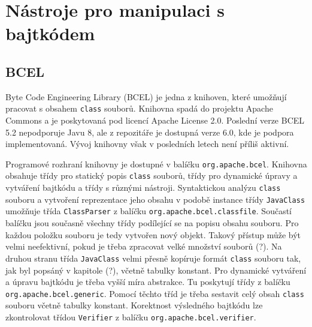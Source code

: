 \chapter{Nástroje pro manipulaci s bajtkódem}




\section{BCEL}



Byte Code Engineering Library (BCEL) je jedna z knihoven, které umožňují pracovat s obsahem \texttt{class} souborů. Knihovna spadá do projektu Apache Commons a je poskytovaná pod licencí Apache License 2.0. Poslední verze BCEL 5.2 nepodporuje Javu 8, ale z repozitáře je dostupná verze 6.0, kde je podpora implementovaná. Vývoj knihovny však v posledních letech není příliš aktivní. 

Programové rozhraní knihovny je dostupné v balíčku \texttt{org.apache.bcel}. Knihovna obsahuje třídy pro statický popis \texttt{class} souborů, třídy pro dynamické úpravy a vytváření bajtkódu a třídy s různými nástroji. Syntaktickou analýzu \texttt{class} souboru a vytvoření reprezentace jeho obsahu v podobě instance třídy \texttt{JavaClass} umožňuje třída \texttt{ClassParser} z balíčku \texttt{org.apache.bcel.classfile}. Součastí balíčku jsou současně všechny třídy podílející se na popisu obsahu souboru. Pro každou položku souboru je tedy vytvořen nový objekt. Takový přístup může být velmi neefektivní, pokud je třeba zpracovat velké množství souborů (?). Na druhou stranu třída \texttt{JavaClass} velmi přesně kopíruje formát \texttt{class} souboru tak, jak byl popsáný v kapitole (?), včetně tabulky konstant.
Pro dynamické vytváření a úpravu bajtkódu je třeba vyšší míra abstrakce. Tu poskytují třídy z balíčku \texttt{org.apache.bcel.generic}. Pomocí těchto tříd je třeba sestavit celý obsah \texttt{class} souboru včetně tabulky konstant. Korektnost výsledného bajtkódu lze zkontrolovat třídou \texttt{Verifier} z balíčku \texttt{org.apache.bcel.verifier}.

